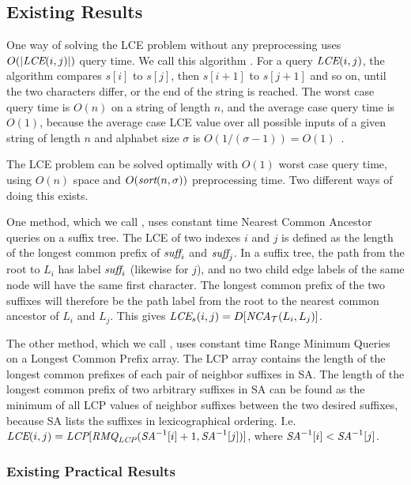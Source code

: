 \documentclass[a4]{article}
\begin{document}
\subsection{Existing Results\label{sec:existing-results}}

One way of solving the LCE problem without any preprocessing uses $O(|\textit{LCE}(i,j)|)$ query time. We call this algorithm . For a query $\textit{LCE}(i,j)$, the algorithm compares $s[i]$ to $s[j]$, then $s[i+1]$ to $s[j+1]$ and so on, until the two characters differ, or the end of the string is reached. The worst case query time is $O(n)$ on a string of length $n$, and the average case query time is $O(1)$, because the average case LCE value over all possible inputs of a given string of length $n$ and alphabet size $\sigma$ is $O(1/(\sigma-1))=O(1)$~\cite{ilie-navarro-tinta}.

The LCE problem can be solved optimally with $O(1)$ worst case query time, using $O(n)$ space and $O(\textit{sort}(n,\sigma))$ preprocessing time. Two different ways of doing this exists.

One method, which we call , uses constant time Nearest Common Ancestor queries on a suffix tree. The LCE of two indexes $i$ and $j$ is defined as the length of the longest common prefix of $\textit{suff}_i$ and $\textit{suff}_j$. In a suffix tree, the path from the root to $L_i$ has label $\textit{suff}_i$ (likewise for $j$), and no two child edge labels of the same node will have the same first character. The longest common prefix of the two suffixes will therefore be the path label from the root to the nearest common ancestor of $L_i$ and $L_j$. This gives $\textit{LCE}_s(i,j) = D[\textit{NCA}_\mathcal{T}(L_i,L_j)]$.

The other method, which we call , uses constant time Range Minimum Queries on a Longest Common Prefix array. The LCP array contains the length of the longest common prefixes of each pair of neighbor suffixes in SA. The length of the longest common prefix of two arbitrary suffixes in SA can be found as the minimum of all LCP values of neighbor suffixes between the two desired suffixes, because SA lists the suffixes in lexicographical ordering. I.e. $\textit{LCE}(i,j)=\textit{LCP}[\textit{RMQ}_{\textit{LCP}}(\textit{SA}^{-1}[i] + 1, \textit{SA}^{-1}[j])]$, where $\textit{SA}^{-1}[i] < \textit{SA}^{-1}[j]$.

\subsubsection{Existing Practical Results}
\end{document}
